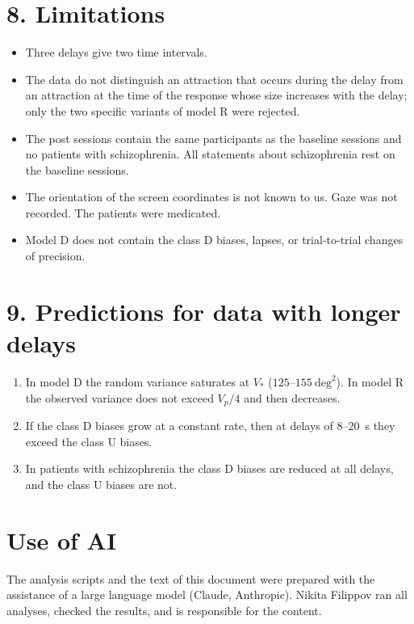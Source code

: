 \documentclass[10pt,a4paper]{article}
\newcommand{\dsq}{\mathrm{deg}^2}
\begin{document}
\section*{8. Limitations}

\begin{itemize}
\item Three delays give two time intervals.
\item The data do not distinguish an attraction that occurs during the delay from an attraction at the time
of the response whose size increases with the delay; only the two specific variants of model R were rejected.
\item The post sessions contain the same participants as the baseline sessions and no patients with
schizophrenia. All statements about schizophrenia rest on the baseline sessions.
\item The orientation of the screen coordinates is not known to us. Gaze was not recorded. The patients were
medicated.
\item Model D does not contain the class D biases, lapses, or trial-to-trial changes of precision.
\end{itemize}

\section*{9. Predictions for data with longer delays}

\begin{enumerate}
\item In model D the random variance saturates at $V_*$ ($125$--$155~\dsq$). In model R the observed variance
does not exceed $V_p/4$ and then decreases.
\item If the class D biases grow at a constant rate, then at delays of $8$--$20$~s they exceed the class U
biases.
\item In patients with schizophrenia the class D biases are reduced at all delays, and the class U biases
are not.
\end{enumerate}

\section*{Use of AI}

The analysis scripts and the text of this document were prepared with the assistance of a large language model (Claude, Anthropic). Nikita Filippov ran all analyses, checked the results, and is responsible for the content.
\end{document}
